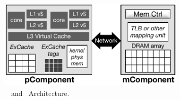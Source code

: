 {
\begin{figure}[th]
\begin{center}
\centerline{\includegraphics[width=0.8\textwidth]{lego/Figures/hwarch.pdf}}
\caption[\lego\ \pcomponent\ and \mcomponent\ Architecture.]{\lego\ \pcomponent\ and \mcomponent\ Architecture.}
\label{fig-lego-hw-arch}
\end{center}
\end{figure}
}
